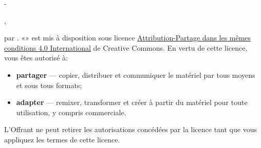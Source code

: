 
\begingroup
\calccentering{\unitlength}
\begin{adjustwidth*}{\unitlength}{-\unitlength}
  \setlength{\parindent}{0pt}
  \setlength{\parskip}{\baselineskip}
  \small

  {\theauthor}, {\year}

  {\textcopyright} {\year} par {\theauthor}. «\thetitle» est mis à
  disposition sous licence
  \href{https://creativecommons.org/licenses/by-sa/4.0/deed.fr}{%
    Attribution-Partage dans les mêmes conditions 4.0 International}
  de Creative Commons. En vertu de cette licence, vous êtes autorisé
  à:
  \begin{itemize}
  \item \textbf{partager} --- copier, distribuer et communiquer le
    matériel par tous moyens et sous tous formats;
  \item \textbf{adapter} --- remixer, transformer et créer à partir du
    matériel pour toute utilisation, y compris commerciale.
  \end{itemize}
  L'Offrant ne peut retirer les autorisations concédées par la licence
  tant que vous appliquez les termes de cette licence.


\end{adjustwidth*}
